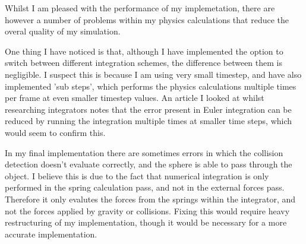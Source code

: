 \documentclass[]{acmsiggraph}
\begin{document}
Whilst I am pleased with the performance of my implemetation, there are however a number of problems within my physics calculations that reduce the overal quality of my simulation.

One thing I have noticed is that, although I have implemented the option to switch between different integration schemes, the difference between them is negligible. I suspect this is because I am using very small timestep, and have also implemented 'sub steps', which performs the physics calculations multiple times per frame at even smaller timestep values. An article \cite{integrators} I looked at whilst researching integrators notes that the error present in Euler integration can be reduced by running the integration multiple times at smaller time steps, which would seem to confirm this.

In my final implementation there are sometimes errors in which the collision detection doesn't evaluate correctly, and the sphere is able to pass through the object. I believe this is due to the fact that numerical integration is only performed in the spring calculation pass, and not in the external forces pass. Therefore it only evalutes the forces from the springs within the integrator, and not the forces applied by gravity or collisions. Fixing this would require heavy restructuring of my implementation, though it would be necessary for a more accurate implementation.



\end{document}
